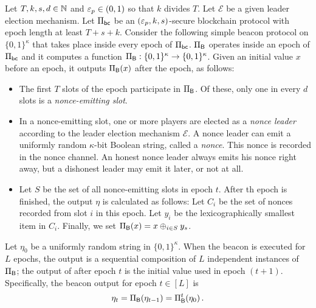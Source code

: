 \begin{definition}
  Let $T, k, s,d \in \mathbb{N}$ and $\mathsf{\varepsilon}_p \in (0,1)$ 
  so that $k$ divides $T$.
  Let $\mathcal{E}$ be a given leader election mechanism.
  Let $\Pi_\mathsf{bc}$ be an $(\mathsf{\varepsilon}_p, k, s)$-secure blockchain protocol 
  with epoch length at least $T + s + k$. 
  Consider the following simple beacon protocol on $\{0,1\}^\kappa$ 
  that takes place inside every epoch of $\Pi_\mathsf{bc}$. 
  $\Pi_{\mathsf{B}}$ operates inside an epoch of $\Pi_\mathsf{bc}$ 
  and it computes a function 
  $\Pi_{\mathsf{B}} : \{0,1\}^\kappa \rightarrow \{0,1\}^\kappa$. 
  Given an initial value $x$ before an epoch, 
  it outputs $\Pi_{\mathsf{B}}(x)$ 
  after the epoch, as follows:
  \begin{itemize}
    \item The first $T$ slots of the epoch participate in $\Pi_{\mathsf{B}}$. 
    Of these, only one in every $d$ slots is a \emph{nonce-emitting slot}. 

    \item In a nonce-emitting slot, one or more players are elected as a \emph{nonce leader} 
    according to the leader election mechanism $\mathcal{E}$.
    A nonce leader can emit a uniformly random $\kappa$-bit Boolean string, called a \emph{nonce}. 
    This nonce is recorded in the nonce channel. 
    An honest nonce leader always emits his nonce right away, 
    but a dishonest leader may emit it later, or not at all.

    \item 
    Let $S$ be the set of all nonce-emitting slots in epoch $t$.
    After th epoch is finished, the output $\eta$ is calculated as follows:
    Let $C_i$ be the set of nonces recorded from slot $i$ in this epoch. 
    Let $y_i$ be the lexicographically smallest item in $C_i$.
    Finally, we set $\Pi_{\mathsf{B}}(x) = x \oplus_{i \in S} y_s$.
  \end{itemize}
  Let $\eta_0$ be a uniformly random string in $\{0,1\}^\kappa$. 
  When the beacon is executed for $L$ epochs, 
  the output is a sequential composition of 
  $L$ independent instances of $\Pi_{\mathsf{B}}$; 
  the output of after epoch $t$ is the initial value used in epoch $(t+1)$. 
  Specifically, 
  the beacon output for epoch $t \in [L]$ is 
  \begin{align}\label{eq:beacon-iterated}
    \eta_t = \Pi_{\mathsf{B}}(\eta_{t-1}) = \Pi_{\mathsf{B}}^t(\eta_0)\,.
  \end{align}
\end{definition}



